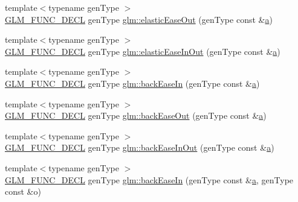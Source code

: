 \begin{DoxyCompactItemize}
\item 
{\footnotesize template$<$typename gen\+Type $>$ }\\\mbox{\hyperlink{setup_8hpp_ab2d052de21a70539923e9bcbf6e83a51}{G\+L\+M\+\_\+\+F\+U\+N\+C\+\_\+\+D\+E\+CL}} gen\+Type \mbox{\hyperlink{group__gtx__easing_gace9c9d1bdf88bf2ab1e7cdefa54c7365}{glm\+::elastic\+Ease\+Out}} (gen\+Type const \&\mbox{\hyperlink{_s_d_l__opengl__glext_8h_a3309789fc188587d666cda5ece79cf82}{a}})
\item 
{\footnotesize template$<$typename gen\+Type $>$ }\\\mbox{\hyperlink{setup_8hpp_ab2d052de21a70539923e9bcbf6e83a51}{G\+L\+M\+\_\+\+F\+U\+N\+C\+\_\+\+D\+E\+CL}} gen\+Type \mbox{\hyperlink{group__gtx__easing_ga2db4ac8959559b11b4029e54812908d6}{glm\+::elastic\+Ease\+In\+Out}} (gen\+Type const \&\mbox{\hyperlink{_s_d_l__opengl__glext_8h_a3309789fc188587d666cda5ece79cf82}{a}})
\item 
{\footnotesize template$<$typename gen\+Type $>$ }\\\mbox{\hyperlink{setup_8hpp_ab2d052de21a70539923e9bcbf6e83a51}{G\+L\+M\+\_\+\+F\+U\+N\+C\+\_\+\+D\+E\+CL}} gen\+Type \mbox{\hyperlink{group__gtx__easing_ga93cddcdb6347a44d5927cc2bf2570816}{glm\+::back\+Ease\+In}} (gen\+Type const \&\mbox{\hyperlink{_s_d_l__opengl__glext_8h_a3309789fc188587d666cda5ece79cf82}{a}})
\item 
{\footnotesize template$<$typename gen\+Type $>$ }\\\mbox{\hyperlink{setup_8hpp_ab2d052de21a70539923e9bcbf6e83a51}{G\+L\+M\+\_\+\+F\+U\+N\+C\+\_\+\+D\+E\+CL}} gen\+Type \mbox{\hyperlink{group__gtx__easing_gabf25069fa906413c858fd46903d520b9}{glm\+::back\+Ease\+Out}} (gen\+Type const \&\mbox{\hyperlink{_s_d_l__opengl__glext_8h_a3309789fc188587d666cda5ece79cf82}{a}})
\item 
{\footnotesize template$<$typename gen\+Type $>$ }\\\mbox{\hyperlink{setup_8hpp_ab2d052de21a70539923e9bcbf6e83a51}{G\+L\+M\+\_\+\+F\+U\+N\+C\+\_\+\+D\+E\+CL}} gen\+Type \mbox{\hyperlink{group__gtx__easing_gace6d24722a2f6722b56398206eb810bb}{glm\+::back\+Ease\+In\+Out}} (gen\+Type const \&\mbox{\hyperlink{_s_d_l__opengl__glext_8h_a3309789fc188587d666cda5ece79cf82}{a}})
\item 
{\footnotesize template$<$typename gen\+Type $>$ }\\\mbox{\hyperlink{setup_8hpp_ab2d052de21a70539923e9bcbf6e83a51}{G\+L\+M\+\_\+\+F\+U\+N\+C\+\_\+\+D\+E\+CL}} gen\+Type \mbox{\hyperlink{group__gtx__easing_ga33777c9dd98f61d9472f96aafdf2bd36}{glm\+::back\+Ease\+In}} (gen\+Type const \&\mbox{\hyperlink{_s_d_l__opengl__glext_8h_a3309789fc188587d666cda5ece79cf82}{a}}, gen\+Type const \&o)

\end{DoxyCompactItemize}
